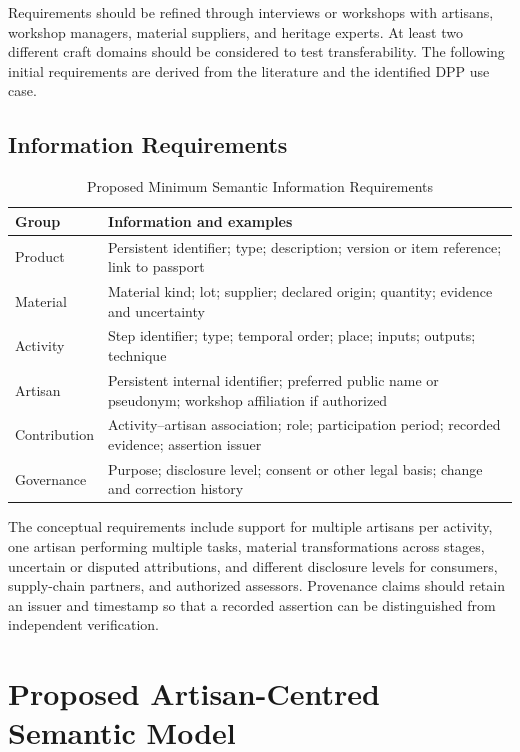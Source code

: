 \documentclass[conference]{IEEEtran}
\begin{document}
Requirements should be refined through interviews or workshops with artisans, workshop managers, material suppliers, and heritage experts. At least two different craft domains should be considered to test transferability. The following initial requirements are derived from the literature and the identified DPP use case.

\subsection{Information Requirements}
\begin{table}[t]
\caption{Proposed Minimum Semantic Information Requirements}
\label{tab:req}
\centering
\scriptsize
\begin{tabular}{>{\raggedright\arraybackslash}p{}>{\raggedright\arraybackslash}p{}}
\toprule
Group & Information and examples \\
\midrule
Product & Persistent identifier; type; description; version or item reference; link to passport \\
Material & Material kind; lot; supplier; declared origin; quantity; evidence and uncertainty \\
Activity & Step identifier; type; temporal order; place; inputs; outputs; technique \\
Artisan & Persistent internal identifier; preferred public name or pseudonym; workshop affiliation if authorized \\
Contribution & Activity--artisan association; role; participation period; recorded evidence; assertion issuer \\
Governance & Purpose; disclosure level; consent or other legal basis; change and correction history \\
\bottomrule
\end{tabular}
\end{table}

The conceptual requirements include support for multiple artisans per activity, one artisan performing multiple tasks, material transformations across stages, uncertain or disputed attributions, and different disclosure levels for consumers, supply-chain partners, and authorized assessors. Provenance claims should retain an issuer and timestamp so that a recorded assertion can be distinguished from independent verification.

\section{Proposed Artisan-Centred Semantic Model}
\end{document}
